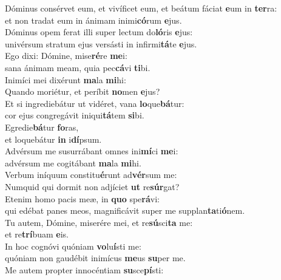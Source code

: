 \evenverse Dóminus consérvet eum, et vivíficet eum, et beátum fáciat \textbf{e}um in \textbf{ter}ra:~\*\\
\evenverse et non tradat eum in ánimam inimi\textbf{có}rum \textbf{e}jus.\\
\oddverse Dóminus opem ferat illi super lectum do\textbf{ló}ris \textbf{e}jus:~\*\\
\oddverse univérsum stratum ejus versásti in infirmi\textbf{tá}te \textbf{e}jus.\\
\evenverse Ego dixi: Dómine, mise\textbf{ré}re \textbf{me}i:~\*\\
\evenverse sana ánimam meam, quia pec\textbf{cá}vi \textbf{ti}bi.\\
\oddverse Inimíci mei dixérunt \textbf{ma}la \textbf{mi}hi:~\*\\
\oddverse Quando moriétur, et períbit \textbf{no}men \textbf{e}jus?\\
\evenverse Et si ingrediebátur ut vidéret, vana \textbf{lo}que\textbf{bá}tur:~\*\\
\evenverse cor ejus congregávit iniqui\textbf{tá}tem \textbf{si}bi.\\
\oddverse Egredie\textbf{bá}tur \textbf{fo}ras,~\*\\
\oddverse et loquebátur \textbf{in} i\textbf{dí}psum.\\
\evenverse Advérsum me susurrábant omnes ini\textbf{mí}ci \textbf{me}i:~\*\\
\evenverse advérsum me cogitábant \textbf{ma}la \textbf{mi}hi.\\
\oddverse Verbum iníquum constitu\textbf{é}runt ad\textbf{vér}sum me:~\*\\
\oddverse Numquid qui dormit non adjíciet \textbf{ut} re\textbf{súr}gat?\\
\evenverse Etenim homo pacis meæ, in \textbf{quo} spe\textbf{rá}vi:~\*\\
\evenverse qui edébat panes meos, magnificávit super me supplan\textbf{ta}ti\textbf{ó}nem.\\
\oddverse Tu autem, Dómine, miserére mei, et re\textbf{sú}sci\textbf{ta} me:~\*\\
\oddverse et re\textbf{trí}buam \textbf{e}is.\\
\evenverse In hoc cognóvi quóniam \textbf{vo}lu\textbf{í}sti me:~\*\\
\evenverse quóniam non gaudébit inimícus \textbf{me}us \textbf{su}per me.\\
\oddverse Me autem propter innocéntiam \textbf{su}sce\textbf{pí}sti:~\*\\

